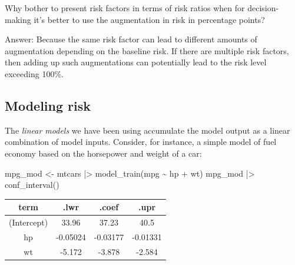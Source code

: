 \documentclass[
  letterpaper,
  DIV=11,
  numbers=noendperiod,
  oneside]{scrartcl}
\newenvironment{Shaded}{\begin{snugshade}}{\end{snugshade}}
\newcommand{\FunctionTok}[1]{\textcolor[rgb]{0.28,0.35,0.67}{#1}}
\newcommand{\NormalTok}[1]{\textcolor[rgb]{0.00,0.23,0.31}{#1}}
\newcommand{\OtherTok}[1]{\textcolor[rgb]{0.00,0.23,0.31}{#1}}
\newcommand{\SpecialCharTok}[1]{\textcolor[rgb]{0.37,0.37,0.37}{#1}}
\begin{document}
\begin{tcolorbox}[enhanced jigsaw, colbacktitle=quarto-callout-note-color!10!white, opacityback=0, breakable, opacitybacktitle=0.6, colback=white, coltitle=black, arc=.35mm, title=\textcolor{quarto-callout-note-color}{\faInfo}\hspace{0.5em}{Question}, left=2mm, colframe=quarto-callout-note-color-frame, rightrule=.15mm, bottomrule=.15mm, leftrule=.75mm, bottomtitle=1mm, toptitle=1mm, titlerule=0mm, toprule=.15mm]

Why bother to present risk factors in terms of risk ratios when for
decision-making it's better to use the augmentation in risk in
percentage points?

Answer: Because the same risk factor can lead to different amounts of
augmentation depending on the baseline risk. If there are multiple risk
factors, then adding up such augmentations can potentially lead to the
risk level exceeding 100\%.

\end{tcolorbox}

\subsection{Modeling risk}\label{modeling-risk}

The \emph{linear models} we have been using accumulate the model output
as a linear combination of model inputs. Consider, for instance, a
simple model of fuel economy based on the horsepower and weight of a
car:

\begin{Shaded}
\begin{Highlighting}[]
\NormalTok{mpg\_mod }\OtherTok{\textless{}{-}}\NormalTok{ mtcars }\SpecialCharTok{|\textgreater{}} \FunctionTok{model\_train}\NormalTok{(mpg }\SpecialCharTok{\textasciitilde{}}\NormalTok{ hp }\SpecialCharTok{+}\NormalTok{ wt) }
\NormalTok{mpg\_mod }\SpecialCharTok{|\textgreater{}} \FunctionTok{conf\_interval}\NormalTok{()}
\end{Highlighting}
\end{Shaded}

\begin{longtable}[]{@{}cccc@{}}
\toprule\noalign{}
term & .lwr & .coef & .upr \\
\midrule\noalign{}
\endhead
\bottomrule\noalign{}
\endlastfoot
(Intercept) & 33.96 & 37.23 & 40.5 \\
hp & -0.05024 & -0.03177 & -0.01331 \\
wt & -5.172 & -3.878 & -2.584 \\
\end{longtable}
\end{document}
